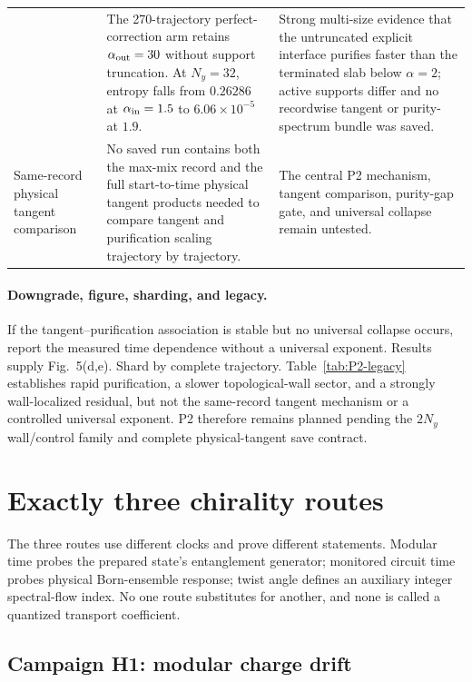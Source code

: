 \documentclass[aps,prx,twocolumn,floatfix,nofootinbib,superscriptaddress,longbibliography]{revtex4-2}
\begin{document}
\begin{table}[t]
\begin{tabularx}{\textwidth}{@{}L{0.75}L{1.10}L{1.15}@{}}
& The 270-trajectory perfect-correction arm retains $\alpha_{\rm out}=30$ without support
truncation.  At $N_y=32$, entropy falls from $0.26286$ at $\alpha_{\rm in}=1.5$ to
$6.06\times10^{-5}$ at $1.9$.
& Strong multi-size evidence that the untruncated explicit interface purifies faster than
the terminated slab below $\alpha=2$; active supports differ and no recordwise tangent or
purity-spectrum bundle was saved. \\
Same-record physical tangent comparison
& No saved run contains both the max-mix record and the full start-to-time physical
tangent products needed to compare tangent and purification scaling trajectory by trajectory.
& The central P2 mechanism, tangent comparison, purity-gap gate, and universal collapse
remain untested. \\
\bottomrule
\end{tabularx}
\end{table}

\paragraph*{Downgrade, figure, sharding, and legacy.}
If the tangent--purification association is stable but no universal collapse occurs,
report the measured time dependence without a universal exponent.  Results supply Fig.~5(d,e).
Shard by complete trajectory.  Table~\ref{tab:P2-legacy} establishes rapid purification,
a slower topological-wall sector, and a strongly wall-localized residual, but not the
same-record tangent mechanism or a controlled universal exponent.  P2 therefore remains
planned pending the $2N_y$ wall/control family and complete physical-tangent save contract.

\clearpage
\section{Exactly three chirality routes}

The three routes use different clocks and prove different statements.  Modular time probes
the prepared state's entanglement generator; monitored circuit time probes physical
Born-ensemble response; twist angle defines an auxiliary integer spectral-flow index.  No
one route substitutes for another, and none is called a quantized transport coefficient.

\subsection{Campaign H1: modular charge drift}
\label{camp:H1}
\end{document}

